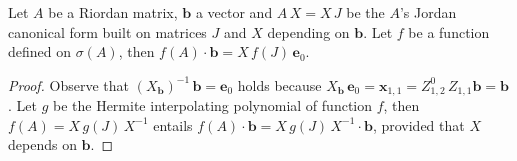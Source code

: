 \begin{theorem}
Let $A$ be a Riordan matrix, $\boldsymbol{b}$ a vector and $A\,X = X\,J$ be the
$A$'s Jordan canonical form built on matrices $J$ and $X$ depending on
$\boldsymbol{b}$.  Let $f$ be a function  defined on $\sigma(A)$, then
$f(A)\cdot\boldsymbol{b} = X\,f(J)\,\boldsymbol{e}_{0}$.
\end{theorem}
\begin{proof}
Observe that
$\left(X_{\boldsymbol{b}}\right)^{-1}\,\boldsymbol{b}=\boldsymbol{e}_{0}$ holds
because $X_{\boldsymbol{b}}\,\boldsymbol{e}_{0}=\boldsymbol{x}_{1,1} =
Z_{1,2}^{0}\,Z_{1,1}\boldsymbol{b}=\boldsymbol{b}$.  Let $g$ be the Hermite
interpolating polynomial of function $f$, then $f(A) = X\,g(J)\,X^{-1}$ entails
$f(A)\cdot\boldsymbol{b} = X\,g(J)\,X^{-1}\cdot\boldsymbol{b}$, provided that
$X$ depends on $\boldsymbol{b}$.
\end{proof}
